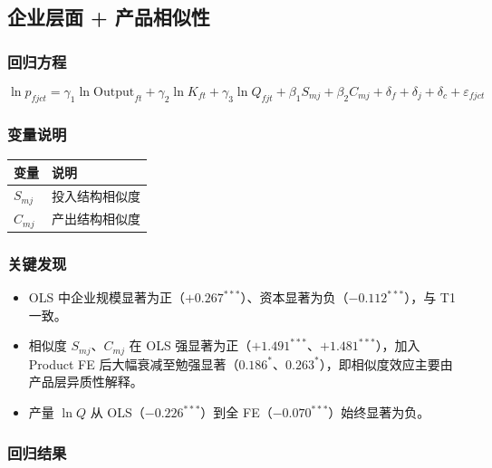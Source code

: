 \documentclass[12pt]{article}
\begin{document}
\subsection{企业层面 + 产品相似性}

\subsubsection*{回归方程}

\begin{equation}
  \ln p_{fjct} = \gamma_1 \ln\mathrm{Output}_{ft} + \gamma_2 \ln K_{ft}
    + \gamma_3 \ln Q_{fjt}
    + \beta_1 S_{mj} + \beta_2 C_{mj}
    + \delta_f + \delta_j + \delta_c + \varepsilon_{fjct}
\end{equation}

\subsubsection*{变量说明}

\begin{table}[H]
  \centering\small
  \begin{tabular}{L{3.5cm} L{10cm}}
    \toprule
    变量 & 说明 \\
    \midrule
    $S_{mj}$ & 投入结构相似度\\[3pt]
    $C_{mj}$ & 产出结构相似度 \\[3pt]
    \bottomrule
  \end{tabular}
\end{table}

\subsubsection*{关键发现}

\begin{itemize}[nosep]
  \item OLS 中企业规模显著为正（$+0.267^{***}$）、资本显著为负（$-0.112^{***}$），与 T1 一致。
  \item 相似度 $S_{mj}$、$C_{mj}$ 在 OLS 强显著为正（$+1.491^{***}$、$+1.481^{***}$），加入 Product FE 后大幅衰减至勉强显著（$0.186^{*}$、$0.263^{*}$），即相似度效应主要由产品层异质性解释。
  \item 产量 $\ln Q$ 从 OLS（$-0.226^{***}$）到全 FE（$-0.070^{***}$）始终显著为负。
\end{itemize}

\subsubsection*{回归结果}
\end{document}
